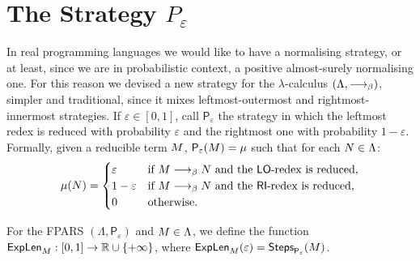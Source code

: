 \section{The Strategy $P_\varepsilon$}
In real programming languages we would like to have a normalising strategy, or at least, since we are in probabilistic context, a positive almost-surely normalising one. For this reason we devised a new strategy for the $\lambda$-calculus $(\Lambda,\longrightarrow_\beta)$, simpler and traditional, since it mixes leftmost-outermost and rightmost-innermost strategies. If $\varepsilon\in[0,1]$, call $\mathsf{P}_\varepsilon$ the strategy in which the leftmost redex is reduced with probability $\varepsilon$ and the rightmost one with probability $1-\varepsilon$. Formally, given a reducible term $M$, $\mathsf{P}_\varepsilon(M)=\mu$ such that for each $N\in\Lambda$:
$$
\mu(N)=\begin{cases}
\varepsilon & \text{if }M\longrightarrow_\beta N\text{ and the }\textsf{LO}\text{-redex is reduced,}\\
1-\varepsilon & \text{if }M\longrightarrow_\beta N\text{ and the }\textsf{RI}\text{-redex is reduced,}\\
0 & \text{otherwise}.\\
\end{cases}
$$
\begin{notation}
	For the FPARS $(\Lambda,\mathsf{P}_\varepsilon)$ and $M\in\Lambda$, we define the function $\textsf{ExpLen}_{M}:[0,1]\rightarrow\mathbb{R}\cup\{+\infty\}$, where
	$\textsf{ExpLen}_{M}(\varepsilon)=\textsf{Steps}_{\mathsf{P}_\varepsilon}(M)$.
\end{notation}

